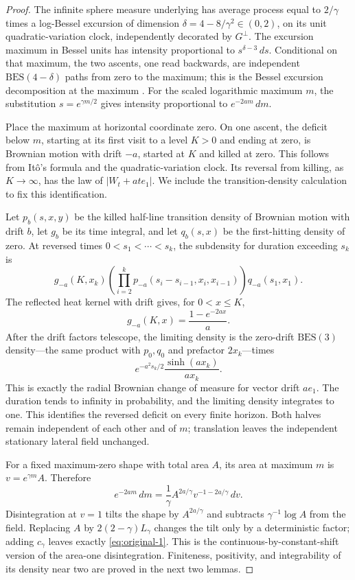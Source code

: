 \begin{proof}
The infinite sphere measure underlying
\cite[Definition 4.21(ii)]{DMS} has average process equal to $2/\gamma$ times
a log-Bessel excursion of dimension
$\delta=4-8/\gamma^2\in(0,2)$, on its unit quadratic-variation clock,
independently decorated by $G^\perp$.  The excursion maximum in Bessel units
has intensity proportional to $s^{\delta-3}\,ds$.  Conditional on that
maximum, the two ascents, one read backwards, are independent
$\mathrm{BES}(4-\delta)$ paths from zero to the maximum; this is the Bessel
excursion decomposition at the maximum
\cite[Theorem 1 and the Bessel specialization following it]{PitmanYor}.
For the scaled logarithmic maximum $m$, the substitution
$s=e^{\gamma m/2}$ gives intensity proportional to $e^{-2am}\,dm$.

Place the maximum at horizontal coordinate zero.  On one ascent, the deficit
below $m$, starting at its first visit to a level $K>0$ and ending at zero,
is Brownian motion with drift $-a$, started at $K$ and killed at zero.  This
follows from It\^o's formula and the quadratic-variation clock.  Its reversal
from killing, as $K\to\infty$, has the law of $|W_t+at e_1|$.  We include the
transition-density calculation to fix this identification.

Let $p_b(s,x,y)$ be the killed half-line transition density of Brownian motion
with drift $b$, let $g_b$ be its time integral, and let $q_b(s,x)$ be the
first-hitting density of zero.  At reversed times
$0<s_1<\cdots<s_k$, the subdensity for duration exceeding $s_k$ is
\[
 g_{-a}(K,x_k)
 \left(\prod_{i=2}^k
      p_{-a}(s_i-s_{i-1},x_i,x_{i-1})\right)q_{-a}(s_1,x_1).
\]
The reflected heat kernel with drift gives, for $0<x\leq K$,
\[
 g_{-a}(K,x)=\frac{1-e^{-2ax}}a.
\]
After the drift factors telescope, the limiting density is the zero-drift
$\mathrm{BES}(3)$ density---the same product with $p_0,q_0$ and prefactor
$2x_k$---times
\[
 e^{-a^2s_k/2}\frac{\sinh(ax_k)}{ax_k}.
\]
This is exactly the radial Brownian change of measure for vector drift
$ae_1$.  The duration tends to infinity in probability, and the limiting
density integrates to one.  This identifies the reversed deficit on every
finite horizon.  Both halves remain independent of each other and of $m$;
translation leaves the independent stationary lateral field unchanged.

For a fixed maximum-zero shape with total area $A$, its area at maximum $m$
is $v=e^{\gamma m}A$.  Therefore
\[
 e^{-2am}\,dm
   =\frac1\gamma A^{2a/\gamma}v^{-1-2a/\gamma}\,dv.
\]
Disintegration at $v=1$ tilts the shape by $A^{2a/\gamma}$ and subtracts
$\gamma^{-1}\log A$ from the field.  Replacing $A$ by
$2(2-\gamma)L_\gamma$ changes the tilt only by a deterministic factor;
adding $c_\gamma$ leaves exactly \eqref{eq:original-1}.  This is the
continuous-by-constant-shift version of the area-one disintegration.
Finiteness, positivity, and integrability of its density near two are proved
in the next two lemmas.
\end{proof}

